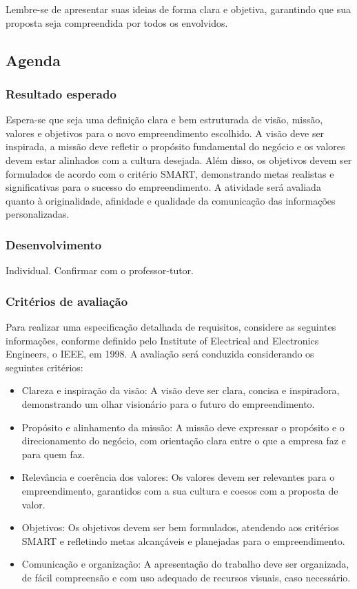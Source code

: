 Lembre-se de apresentar suas ideias de forma clara e objetiva, garantindo que sua proposta seja compreendida por todos os envolvidos.

\subsection{Agenda}

\subsubsection{Resultado esperado}

Espera-se que seja uma definição clara e bem estruturada de visão, missão, valores e
objetivos para o novo empreendimento escolhido. 
A visão deve ser inspirada, a missão deve refletir o propósito fundamental do negócio e os valores devem estar alinhados
com a cultura desejada. 
Além disso, os objetivos devem ser formulados de acordo com
o critério SMART, demonstrando metas realistas e significativas para o sucesso do
empreendimento. 
A atividade será avaliada quanto à originalidade, afinidade e
qualidade da comunicação das informações personalizadas.

\subsubsection{Desenvolvimento}

Individual. Confirmar com o professor-tutor.

\subsubsection{Critérios de avaliação}

Para realizar uma especificação detalhada de requisitos, considere as seguintes
informações, conforme definido pelo Institute of Electrical and Electronics Engineers, o
IEEE, em 1998. 
A avaliação será conduzida considerando os seguintes critérios:

\begin{itemize}
    \item Clareza e inspiração da visão: A visão deve ser clara, concisa e inspiradora,
demonstrando um olhar visionário para o futuro do empreendimento.
    \item Propósito e alinhamento da missão: A missão deve expressar o propósito e o
direcionamento do negócio, com orientação clara entre o que a empresa faz e para
quem faz.
    \item Relevância e coerência dos valores: Os valores devem ser relevantes para o
empreendimento, garantidos com a sua cultura e coesos com a proposta de valor.
    \item Objetivos: Os objetivos devem ser bem formulados, atendendo aos critérios SMART e
refletindo metas alcançáveis e planejadas para o empreendimento.
    \item Comunicação e organização: A apresentação do trabalho deve ser organizada, de
fácil compreensão e com uso adequado de recursos visuais, caso necessário.
\end{itemize}

